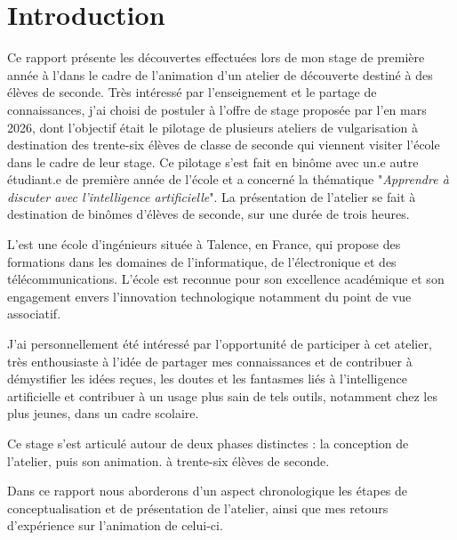 \section*{Introduction}
  Ce rapport présente les découvertes effectuées lors de mon stage de première année à l'\enseirb dans le cadre de l'animation d'un atelier de découverte destiné à des élèves de seconde. Très intéressé par l'enseignement et le partage de connaissances, j'ai choisi de postuler à l'offre de stage proposée par l'\enseirb en mars 2026, dont l'objectif était le pilotage de plusieurs ateliers de vulgarisation à destination des trente-six élèves de classe de seconde qui viennent visiter l'école dans le cadre de leur stage. Ce pilotage s'est fait en binôme avec un.e autre étudiant.e de première année de l'école et a concerné la thématique "\textit{Apprendre à discuter avec l'intelligence artificielle}". La présentation de l'atelier se fait à destination de binômes d'élèves de seconde, sur une durée de trois heures.\par 
  L'\enseirb est une école d'ingénieurs située à Talence, en France, qui propose des formations dans les domaines de l'informatique, de l'électronique et des télécommunications. L'école est reconnue pour son excellence académique et son engagement envers l'innovation technologique notamment du point de vue associatif. \par
J'ai personnellement été intéressé par l'opportunité de participer à cet atelier, très enthousiaste à l’idée de partager mes connaissances et de contribuer à démystifier les idées reçues, les doutes et les fantasmes liés à l’intelligence artificielle et contribuer à un usage plus sain de tels outils, notamment chez les plus jeunes, dans un cadre scolaire. \par
  Ce stage s’est articulé autour de deux phases distinctes : la conception de l’atelier, puis son animation. à trente-six élèves de seconde. \\\par
  Dans ce rapport nous aborderons d'un aspect chronologique les étapes de conceptualisation et de présentation de l'atelier, ainsi que mes retours d'expérience sur l'animation de celui-ci. 
